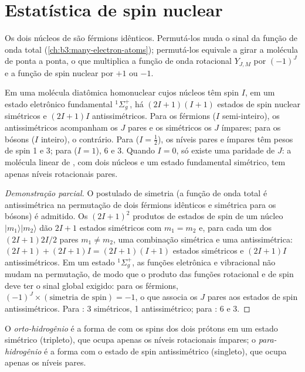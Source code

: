 \section{Estatística de spin nuclear}

Os dois núcleos de  são férmions idênticos. Permutá-los muda o sinal da
função de onda total (\cref{ch:b3:many-electron-atoms}); permutá-los equivale a
girar a molécula de ponta a ponta, o que multiplica a função de onda rotacional
$Y_{J,M}$ por $(-1)^J$ e a função de spin nuclear por $+1$ ou $-1$.

\begin{theorem}\label{thm:b3:statistical-thermo-applied:spin-statistics}
Em uma molécula diatômica homonuclear cujos núcleos têm spin $I$, em um estado
eletrônico fundamental ${}^1\Sigma_g^+$, há $(2I+1)(I+1)$ estados de spin nuclear simétricos
e $(2I+1)I$ antissimétricos. Para os férmions ($I$ semi-inteiro), os antissimétricos
acompanham os $J$ pares e os simétricos os $J$ ímpares; para os bósons ($I$ inteiro),
o contrário. Para  ($I = \frac12$), os níveis pares e ímpares têm pesos de
spin 1 e 3; para  ($I = 1$), 6 e 3. Quando $I = 0$, só existe uma paridade de
$J$: a molécula linear de , com dois núcleos  e um estado
fundamental simétrico, tem apenas níveis rotacionais pares.
\end{theorem}

\begin{proof}[Demonstração parcial]
O postulado de simetria (a função de onda total é antissimétrica na permutação
de dois férmions idênticos e simétrica para os bósons) é admitido. Os
$(2I+1)^2$ produtos de estados de spin de um núcleo $|m_1\rangle|m_2\rangle$ dão $2I+1$ estados
simétricos com $m_1 = m_2$ e, para cada um dos $(2I+1)2I/2$ pares $m_1 \ne m_2$, uma
combinação simétrica e uma antissimétrica: $(2I+1) + (2I+1)I = (2I+1)(I+1)$
estados simétricos e $(2I+1)I$ antissimétricos. Em um estado ${}^1\Sigma_g^+$, as funções
eletrônica e vibracional não mudam na permutação, de modo que o produto das
funções rotacional e de spin deve ter o sinal global exigido: para os
férmions, $(-1)^J \times(\text{simetria de spin}) = -1$, o que associa os $J$ pares
aos estados de spin antissimétricos. Para : 3 simétricos, 1 antissimétrico;
para : 6 e 3.
\end{proof}

\begin{definition}\label{def:b3:statistical-thermo-applied:spin-isomers}
O \emph{orto-hidrogênio} é a forma de  com os spins
dos dois prótons em um estado simétrico (tripleto), que ocupa apenas os níveis
rotacionais ímpares; o \emph{para-hidrogênio} é a forma com
o estado de spin antissimétrico (singleto), que ocupa apenas os níveis pares.
\end{definition}

